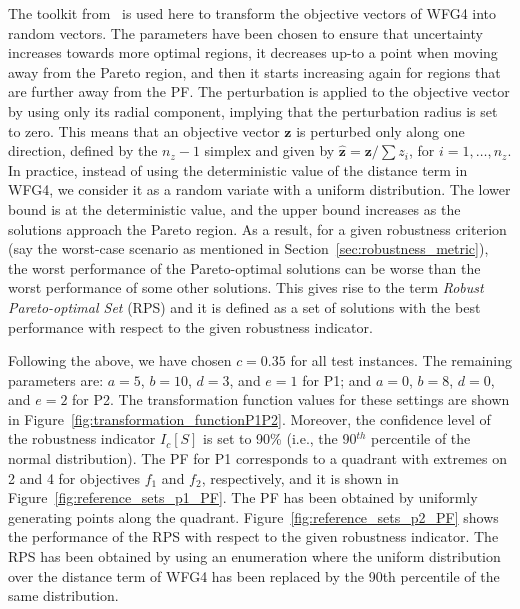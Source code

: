 \documentclass{llncs}
\newcommand{\vz}{\mathbf{z}} %
\begin{document}
The toolkit from~\cite{Salomon2016Toolkit} is used here to transform the objective vectors of WFG4 into random vectors. The parameters have been chosen to ensure that uncertainty  increases towards more optimal regions, it decreases up-to a point when moving away from the Pareto region, and then it starts increasing again for regions that are further away from the PF. The perturbation is applied to the objective vector by using only its radial component, implying that the perturbation radius is set to zero. This means that an objective vector $\vz$ is perturbed only along one direction, defined by the $n_z-1$ simplex and given by $\hat{\vz} = \vz/\sum z_i$, for $i=1,\ldots,n_z$. In practice, instead of using the deterministic value of the distance term in WFG4, we consider it as a random variate with a uniform distribution. The lower bound is at the deterministic value, and the upper bound increases as the solutions approach the Pareto region. As a result, for a given robustness criterion (say the worst-case scenario as mentioned in Section~\ref{sec:robustness_metric}), the worst performance of the Pareto-optimal solutions can be worse than the worst performance of some other solutions. This gives rise to the term \textit{Robust Pareto-optimal Set} (RPS) and it is defined as a set of solutions with the best performance with respect to the given robustness indicator.

Following the above, we have chosen $c=0.35$ for all test instances. The remaining parameters are: $a=5$, $b=10$, $d=3$, and $e=1$ for P1; and $a=0$, $b=8$, $d=0$, and $e=2$ for P2. The transformation function values for these settings are shown in Figure~\ref{fig:transformation_functionP1P2}. Moreover, the confidence level of the robustness indicator $I_c[S]$ is set to 90\% (i.e., the 90$^{th}$ percentile of the normal distribution). The PF for P1 corresponds to a quadrant with extremes on 2 and 4 for objectives $f_1$ and $f_2$, respectively, and it is shown in Figure~\ref{fig:reference_sets_p1_PF}. The PF has been obtained by uniformly generating points along the quadrant. Figure~\ref{fig:reference_sets_p2_PF} shows the performance of the RPS with respect to the given robustness indicator. The RPS has been obtained by using an enumeration where the uniform distribution over the distance term of WFG4 has been replaced by the 90th percentile of the same distribution.
\end{document}
